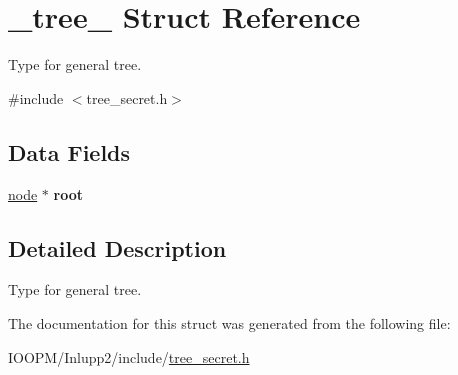 \hypertarget{struct__tree__}{}\section{\+\_\+tree\+\_\+ Struct Reference}
\label{struct__tree__}


Type for general tree.  




{\ttfamily \#include $<$tree\+\_\+secret.\+h$>$}

\subsection*{Data Fields}
\begin{DoxyCompactItemize}
\item 
\hypertarget{struct__tree___aa570215f2f913275d6ff0d586e436d21}{}\hyperlink{struct__node__}{node} $\ast$ {\bfseries root}\label{struct__tree___aa570215f2f913275d6ff0d586e436d21}

\end{DoxyCompactItemize}


\subsection{Detailed Description}
Type for general tree. 

The documentation for this struct was generated from the following file\+:\begin{DoxyCompactItemize}
\item 
I\+O\+O\+P\+M/\+Inlupp2/include/\hyperlink{tree__secret_8h}{tree\+\_\+secret.\+h}\end{DoxyCompactItemize}
